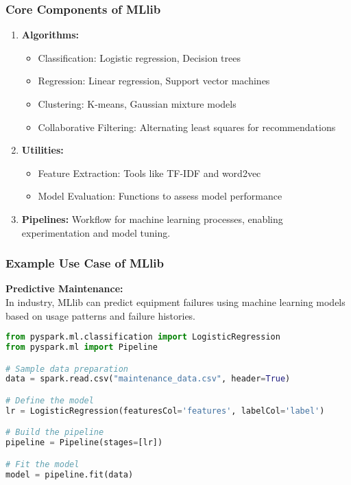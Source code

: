 \documentclass[aspectratio=169]{beamer}
\begin{document}
\begin{frame}[fragile]
    \frametitle{Core Components of MLlib}
    \begin{enumerate}
        \item \textbf{Algorithms:} 
            \begin{itemize}
                \item Classification: Logistic regression, Decision trees
                \item Regression: Linear regression, Support vector machines
                \item Clustering: K-means, Gaussian mixture models
                \item Collaborative Filtering: Alternating least squares for recommendations
            \end{itemize}
        \item \textbf{Utilities:} 
            \begin{itemize}
                \item Feature Extraction: Tools like TF-IDF and word2vec
                \item Model Evaluation: Functions to assess model performance
            \end{itemize}
        \item \textbf{Pipelines:} Workflow for machine learning processes, enabling experimentation and model tuning.
    \end{enumerate}
\end{frame}

\begin{frame}[fragile]
    \frametitle{Example Use Case of MLlib}
    \textbf{Predictive Maintenance:} \\
    In industry, MLlib can predict equipment failures using machine learning models based on usage patterns and failure histories.
    
    \begin{lstlisting}[language=Python]
from pyspark.ml.classification import LogisticRegression
from pyspark.ml import Pipeline

# Sample data preparation
data = spark.read.csv("maintenance_data.csv", header=True)

# Define the model
lr = LogisticRegression(featuresCol='features', labelCol='label')

# Build the pipeline
pipeline = Pipeline(stages=[lr])

# Fit the model
model = pipeline.fit(data)
    \end{lstlisting}
\end{frame}
\end{document}
